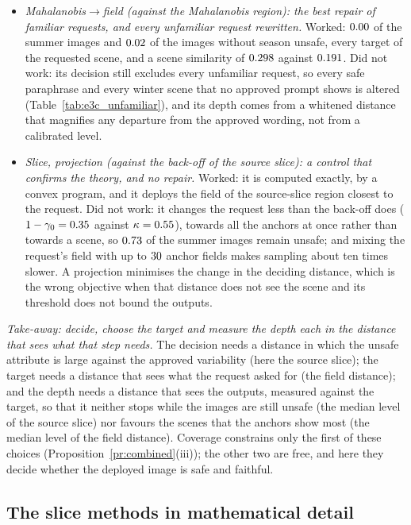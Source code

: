 \documentclass{article}
\theoremstyle{plain}
\theoremstyle{remark}
\begin{document}
\begin{itemize}
\item \emph{Mahalanobis$\to$field (against the Mahalanobis region): the best repair of familiar requests, and every unfamiliar request
rewritten.} Worked: $0.00$ of the summer images and $0.02$ of the images without season unsafe, every target of
the requested scene, and a scene similarity of $0.298$ against $0.191$. Did not work: its decision still excludes
every unfamiliar request, so every safe paraphrase and every winter scene that no approved prompt shows is altered
(Table~\ref{tab:e3c_unfamiliar}), and its depth comes from a whitened distance that magnifies any departure from the approved
wording, not from a calibrated level.
\item \emph{Slice, projection (against the back-off of the source slice): a control that confirms the theory, and no repair.} Worked:
it is computed exactly, by a convex program, and it deploys the field of the source-slice region closest to the request. Did not
work: it changes the request less than the back-off does ($1-\gamma_0=0.35$ against $\kappa=0.55$), towards all the
anchors at once rather than towards a scene, so $0.73$ of the summer images remain unsafe; and mixing the request's field
with up to $30$ anchor fields makes sampling about ten times slower. A projection minimises the change in the deciding distance, which is the
wrong objective when that distance does not see the scene and its threshold does not bound the outputs.
\end{itemize}

\emph{Take-away: decide, choose the target and measure the depth each in the distance that sees what that step needs.} The decision
needs a distance in which the unsafe attribute is large against the approved variability (here the source slice); the target needs a
distance that sees what the request asked for (the field distance); and the depth needs a distance that sees the outputs, measured
against the target, so that it neither stops while the images are still unsafe (the median level of the source slice) nor favours
the scenes that the anchors show most (the median level of the field distance). Coverage constrains only the first of these choices
(Proposition~\ref{pr:combined}(iii)); the other two are free, and here they decide whether the deployed image is safe and faithful.
\FloatBarrier


\subsection{The slice methods in mathematical detail}\label{sec:e3_slice}
\end{document}
